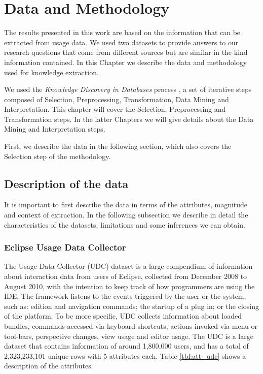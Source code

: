 \chapter{Data and Methodology}
The results presented in this work are based on the information that can be extracted from usage data. We used two datasets to provide answers to our research questions that come from different sources but are similar in the kind information contained. In this Chapter we describe the data and methodology used for knowledge extraction. 
\begin{changedforreviewerlong}
We used the \emph{Knowledge Discovery in Databases} process \cite{FPG96}, a set of iterative steps composed of Selection, Preprocessing, Transformation, Data Mining and Interpretation. This chapter will cover the Selection, Preprocessing and Transformation steps. In the latter Chapters we will give details about the Data Mining and Interpretation steps.
\end{changedforreviewerlong} First, we describe the data in the following section, which also covers the Selection step of the methodology.

\section{Description of the data}
It is important to first describe the data in terms of the attributes, magnitude and context of extraction. In the following subsection we describe in detail the characteristics of the datasets, limitations and some inferences we can obtain.

\subsection{Eclipse Usage Data Collector}
The Usage Data Collector (UDC) dataset is a large compendium of information about interaction data from users of Eclipse, collected from December 2008 to August 2010, with the intention to keep track of how programmers are using the IDE. The framework listens to the events triggered by the user or the system, such as: edition and navigation commands; the startup of a plug in; or the closing of the platform. To be more specific, UDC collects information about loaded bundles, commands accessed via keyboard shortcuts, actions invoked via menu or tool-bars, perspective changes, view usage and editor usage. The UDC is a large dataset that contains information of around 1,800,000 users, and has a total of 2,323,233,101 unique rows with 5 attributes each. Table \ref{tbl:att_udc} shows a description of the attributes.


